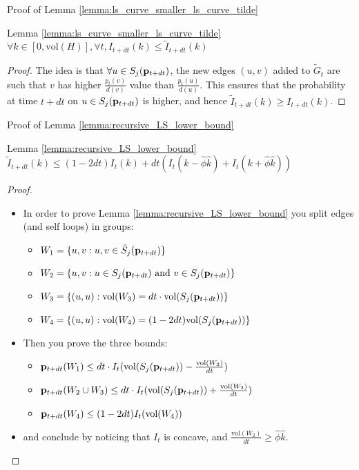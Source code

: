 \documentclass[../main.tex]{subfiles}
\begin{document}
	\begin{frame}{Proof of Lemma \ref{lemma:ls_curve_smaller_ls_curve_tilde}}
		\begin{block}{Lemma \ref{lemma:ls_curve_smaller_ls_curve_tilde}}
			$\forall k\in[0,\text{vol}(H)], \forall t, I_{t+dt}(k) \leq \tilde{I}_{t+dt}(k)$
		\end{block}
		\begin{proof}
			The idea is that $\forall u\in S_j(\bold{p}_{t+dt})$, the new edges $(u,v)$ added to $\tilde{G}_t$ are such that $v$ has higher $\frac{p_t(v)}{d(v)}$ value than $\frac{p_t(u)}{d(u)}$. This ensures that the probability at time $t+dt$ on $u\in S_j(\bold{p}_{t+dt})$ is higher, and hence $\tilde{I}_{t+dt}(k) \geq I_{t+dt}(k)$.
		\end{proof}
	\end{frame}

	\begin{frame}{Proof of Lemma \ref{lemma:recursive_LS_lower_bound}}
		\begin{block}{Lemma \ref{lemma:recursive_LS_lower_bound}}
			$\tilde{I}_{t+dt}(k)\leq (1-2dt)I_t(k) + dt(I_t(k-\hat{\phi}\hat{k}) + I_t(k+\hat{\phi}\hat{k}))$
		\end{block}
		\begin{proof}
			\begin{itemize}
				\item In order to prove Lemma \ref{lemma:recursive_LS_lower_bound} you split edges (and self loops) in groups:
				\begin{itemize}
					\item $W_1 = \{u,v: u,v\in \bar{S}_j(\bold{p}_{t+dt})\}$ 
					\item $W_2 = \{u,v: u\in S_j(\bold{p}_{t+dt}) \text{ and } v\in S_j(\bold{p}_{t+dt})\}$
					\item $W_3 = \{(u,u) : \text{vol}(W_3) = dt\cdot\text{vol}(S_j(\bold{p}_{t+dt}))\}$
					\item $W_4 = \{(u,u) : \text{vol}(W_4) = (1-2dt)\text{vol}(S_j(\bold{p}_{t+dt}))\}$
				\end{itemize}
				\item Then you prove the three bounds:
					\begin{itemize}
						\item $\bold{p}_{t+dt}(W_1) \leq dt \cdot I_t(\text{vol}(S_j(\bold{p}_{t+dt})) - \frac{\text{vol}(W_2)}{dt})$
						\item $\bold{p}_{t+dt}(W_2\cup W_3)\leq dt\cdot I_t(\text{vol}(S_j(\bold{p}_{t+dt})) + \frac{\text{vol}(W_2)}{dt})$
						\item $\bold{p}_{t+dt}(W_4) \leq (1-2dt) I_t(\text{vol}(W_4))$
					\end{itemize}
				\item and conclude by noticing that $I_t$ is concave, and $\frac{\text{vol}(W_2)}{dt} \geq \hat{\phi}\hat{k}$.
			\end{itemize}
		\end{proof}
	\end{frame}
\end{document}
